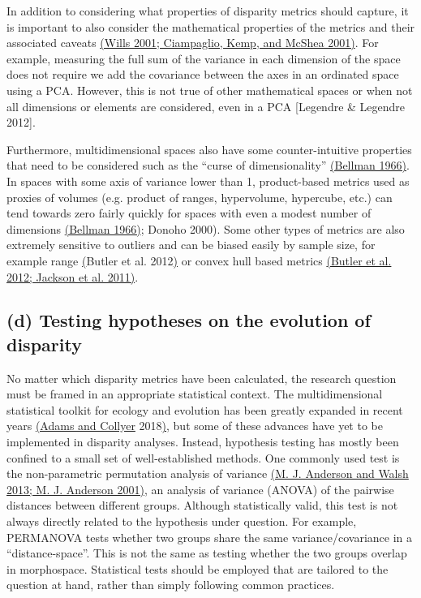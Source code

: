 In addition to considering what properties of disparity metrics should
capture, it is important to also consider the mathematical properties of
the metrics and their associated caveats
\href{https://paperpile.com/c/sTGYvp/nFf7+ROH8}{(Wills 2001; Ciampaglio,
Kemp, and McShea 2001)}. For example, measuring the full sum of the
variance in each dimension of the space does not require we add the
covariance between the axes in an ordinated space using a PCA. However,
this is not true of other mathematical spaces or when not all dimensions
or elements are considered, even in a PCA {[}Legendre \& Legendre
2012{]}.

Furthermore, multidimensional spaces also have some counter-intuitive
properties that need to be considered such as the ``curse of
dimensionality'' \href{https://paperpile.com/c/sTGYvp/Qsl3}{(Bellman
1966)}. In spaces with some axis of variance lower than 1, product-based
metrics used as proxies of volumes (e.g. product of ranges, hypervolume,
hypercube, etc.) can tend towards zero fairly quickly for spaces with
even a modest number of dimensions
\href{https://paperpile.com/c/sTGYvp/Qsl3}{(Bellman 1966)}; Donoho
2000). Some other types of metrics are also extremely sensitive to
outliers and can be biased easily by sample size, for example range
\href{https://paperpile.com/c/sTGYvp/aSSL}{(}Butler et al.
2012\href{https://paperpile.com/c/sTGYvp/aSSL}{)} or convex hull based
metrics \href{https://paperpile.com/c/sTGYvp/aSSL+PwyQ}{(Butler et al.
2012; Jackson et al. 2011)}.

\hypertarget{d-testing-hypotheses-on-the-evolution-of-disparity}{%
\subsection{(d) Testing hypotheses on the evolution of
disparity}\label{d-testing-hypotheses-on-the-evolution-of-disparity}}

No matter which disparity metrics have been calculated, the research
question must be framed in an appropriate statistical context. The
multidimensional statistical toolkit for ecology and evolution has been
greatly expanded in recent years
\href{https://paperpile.com/c/sTGYvp/ZnDd}{(Adams and Collyer}
2018\href{https://paperpile.com/c/sTGYvp/ZnDd}{)}, but some of these
advances have yet to be implemented in disparity analyses. Instead,
hypothesis testing has mostly been confined to a small set of
well-established methods. One commonly used test is the non-parametric
permutation analysis of variance
\href{https://paperpile.com/c/sTGYvp/3hy2+SC6L}{(M. J. Anderson and
Walsh 2013; M. J. Anderson 2001)}, an analysis of variance (ANOVA) of
the pairwise distances between different groups. Although statistically
valid, this test is not always directly related to the hypothesis under
question. For example, PERMANOVA tests whether two groups share the same
variance/covariance in a ``distance-space''. This is not the same as
testing whether the two groups overlap in morphospace. Statistical tests
should be employed that are tailored to the question at hand, rather
than simply following common practices.

